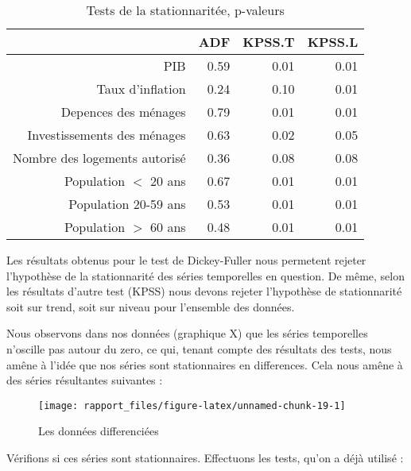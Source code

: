 \documentclass[11pt,]{article}
\begin{document}
\FloatBarrier

\begin{table}[ht]
\centering
\begin{tabular}{rrrr}
  \hline
 & ADF & KPSS.T & KPSS.L \\ 
  \hline
PIB & 0.59 & 0.01 & 0.01 \\ 
  Taux d'inflation & 0.24 & 0.10 & 0.01 \\ 
  Depences des ménages & 0.79 & 0.01 & 0.01 \\ 
  Investissements des ménages & 0.63 & 0.02 & 0.05 \\ 
  Nombre des logements autorisé & 0.36 & 0.08 & 0.08 \\ 
  Population $<$ 20 ans & 0.67 & 0.01 & 0.01 \\ 
  Population 20-59 ans & 0.53 & 0.01 & 0.01 \\ 
  Population $>$ 60 ans & 0.48 & 0.01 & 0.01 \\ 
   \hline
\end{tabular}
\caption{Tests de la stationnaritée, p-valeurs} 
\end{table}

\FloatBarrier

Les résultats obtenus pour le test de Dickey-Fuller nous permetent
rejeter l'hypothèse de la stationnarité des séries temporelles en
question. De même, selon les résultats d'autre test (KPSS) nous devons
rejeter l'hypothèse de stationnarité soit sur trend, soit sur niveau
pour l'ensemble des données.

Nous observons dans nos données (graphique X) que les séries temporelles
n'oscille pas autour du zero, ce qui, tenant compte des résultats des
tests, nous amêne à l'idée que nos séries sont stationnaires en
differences. Cela nous amêne à des séries résultantes suivantes :

\FloatBarrier

\begin{figure}[!htbp]

{\centering \texttt{[image: rapport\_files/figure-latex/unnamed-chunk-19-1]} 

}

\caption{Les données differenciées}\label{fig:unnamed-chunk-19}
\end{figure}

\FloatBarrier

Vérifions si ces séries sont stationnaires. Effectuons les tests, qu'on
a déjà utilisé :

\FloatBarrier
\end{document}
